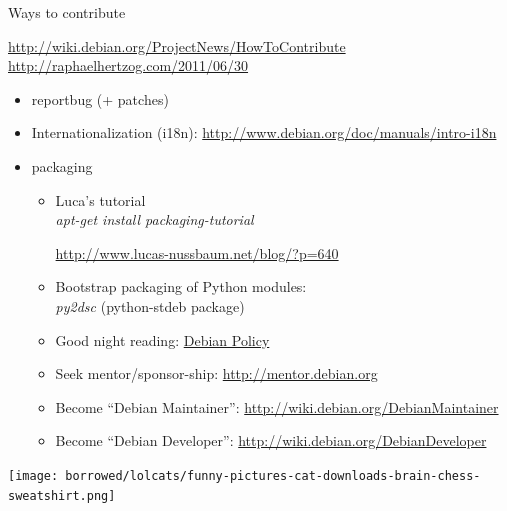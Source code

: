 \documentclass[]{beamer}
\begin{document}
\begin{frame}{Ways to contribute}

\begin{small}
\url{http://wiki.debian.org/ProjectNews/HowToContribute}\\
\url{http://raphaelhertzog.com/2011/06/30}
\end{small}

\begin{itemize}
\item reportbug (+ patches)
\item Internationalization (i18n): \url{http://www.debian.org/doc/manuals/intro-i18n}
\item packaging
  \begin{itemize}
  \item Luca's tutorial\\
    \emph{apt-get install packaging-tutorial} \\
    \begin{small}\url{http://www.lucas-nussbaum.net/blog/?p=640}\end{small}
  \item Bootstrap packaging of Python modules:\\
    \emph{py2dsc} (python-stdeb package)
  \item Good night reading: \href{http://www.debian.org/doc/debian-policy/}{Debian Policy}
  \item Seek mentor/sponsor-ship: \url{http://mentor.debian.org}
  \item Become ``Debian Maintainer'': \url{http://wiki.debian.org/DebianMaintainer}
  \item Become ``Debian Developer'': \url{http://wiki.debian.org/DebianDeveloper}
  \end{itemize}
\end{itemize}
\end{frame}


\begin{frame}
\texttt{[image: borrowed/lolcats/funny-pictures-cat-downloads-brain-chess-sweatshirt.png]}
\end{frame}
\end{document}
